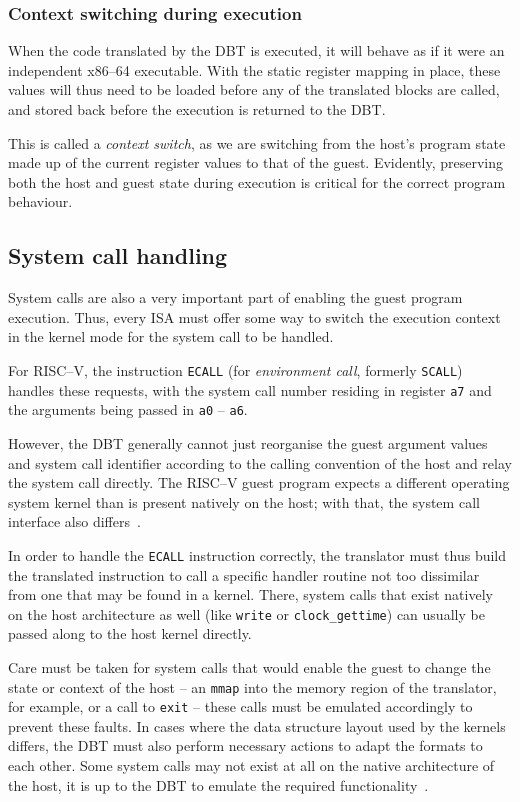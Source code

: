 \subsubsection{Context switching during execution}
When the code translated by the DBT is executed, it will behave as if it were an independent x86--64 executable.
With the static register mapping in place, these values will thus need to be loaded before any of the translated blocks are called, and stored back before the execution is returned to the DBT\@.

This is called a \textit{context switch}, as we are switching from the host's program state made up of the current register values to that of the guest.
Evidently, preserving both the host and guest state during execution is critical for the correct program behaviour.

\subsection{System call handling}
\label{sec:syscall-handling}
System calls are also a very important part of enabling the guest program execution.
Thus, every ISA must offer some way to switch the execution context in the kernel mode for the system call to be handled.

For RISC--V, the instruction \texttt{ECALL} (for \textit{environment call}, formerly \texttt{SCALL}) handles these requests, with the system call number residing in register \texttt{a7} and the arguments being passed in \texttt{a0} -- \texttt{a6}.

However, the DBT generally cannot just reorganise the guest argument values and system call identifier according to the calling convention of the host and relay the system call directly.
The RISC--V guest program expects a different operating system kernel than is present natively on the host;
with that, the system call interface also differs~\cite[S. 2f.]{bintrans}.

In order to handle the \texttt{ECALL} instruction correctly, the translator must thus build the translated instruction to call a specific handler routine not too dissimilar from one that may be found in a kernel.
There, system calls that exist natively on the host architecture as well (like \texttt{write} or \texttt{clock\_gettime}) can usually be passed along to the host kernel directly.

Care must be taken for system calls that would enable the guest to change the state or context of the host -- an \texttt{mmap} into the memory region of the translator, for example, or a call to \texttt{exit} -- these calls must be emulated accordingly to prevent these faults.
In cases where the data structure layout used by the kernels differs, the DBT must also perform necessary actions to adapt the formats to each other.
Some system calls may not exist at all on the native architecture of the host, it is up to the DBT to emulate the required functionality~\cite[S. 2f.]{bintrans}.

